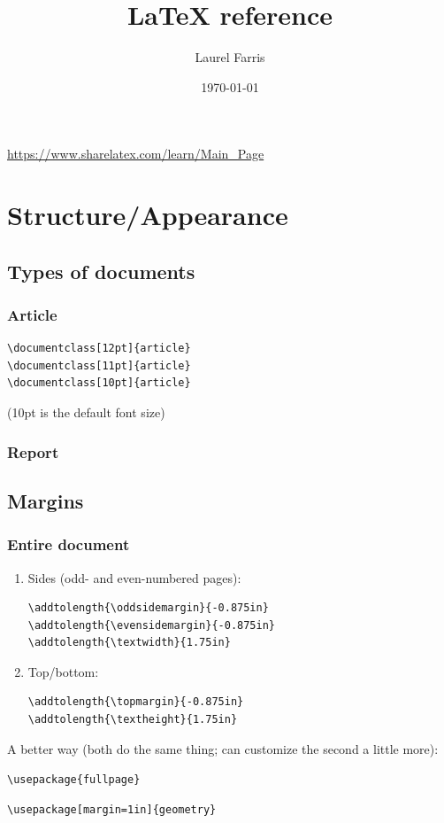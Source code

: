 \documentclass{article}
\title{LaTeX reference}
\author{Laurel Farris}
\date{\today}
\begin{document}
\maketitle
\url{https://www.sharelatex.com/learn/Main_Page}
\section{Structure/Appearance}

\subsection{Types of documents}
\subsubsection{Article}
\begin{verbatim}
\documentclass[12pt]{article}
\documentclass[11pt]{article}
\documentclass[10pt]{article}
\end{verbatim}
(10pt is the default font size)
\subsubsection{Report}

\subsection{Margins}
\subsubsection{Entire document}
\begin{enumerate}
    \item Sides (odd- and even-numbered pages):
\begin{verbatim}
\addtolength{\oddsidemargin}{-0.875in}
\addtolength{\evensidemargin}{-0.875in}
\addtolength{\textwidth}{1.75in}
\end{verbatim}
    \item Top/bottom:
\begin{verbatim}
\addtolength{\topmargin}{-0.875in}
\addtolength{\textheight}{1.75in}
\end{verbatim}
\end{enumerate}
A better way (both do the same thing;
can customize the second a little more):
\begin{itemize*}
    \item \verb|\usepackage{fullpage}|
    \item \verb|\usepackage[margin=1in]{geometry}|
\end{itemize*}
\end{document}
